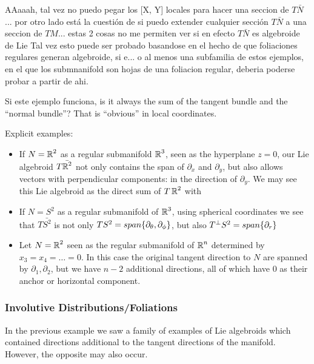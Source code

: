 AAaaah, tal vez no puedo pegar los [X, Y] locales para hacer una seccion de $T \bar N$... por otro lado está la cuestión de si puedo extender cualquier sección $T \bar N$ a una seccion de $TM$... estas 2 cosas no me permiten ver si en efecto $T \bar N$ es algebroide de Lie  Tal vez esto puede ser probado basandose en el hecho de que foliaciones regulares generan algebroide, si e... o al menos una subfamilia de estos ejemplos, en el que los submnanifold son hojas de una foliacion regular, deberia poderse probar a partir de ahi.

Si este ejemplo funciona, is it always the sum of the tangent bundle and the ``normal bundle''? That is ``obvious'' in local coordinates.




Explicit examples:
\begin{itemize}
\item If $N = \operatorname{\mathbb{R}}^2$ as a regular submanifold $\operatorname{\mathbb{R}}^3$, seen as the hyperplane $z = 0$, our Lie algebroid $T \bar {\operatorname{\mathbb{R}}^2}$ not only contains the span of $\partial_x$ and $\partial_y$, but also allows vectors with perpendicular components: in the direction of $\partial_y$. We may see this Lie algebroid as the direct sum of $T \operatorname{\mathbb{R}}^2$ with 
\item If $N = S^2$ as a regular submanifold of $\operatorname{\mathbb{R}}^3$, using spherical coordinates we see that $T \bar {S^2}$ is not only $TS^2 = span\{\partial_\theta, \partial_\phi\}$, but also $T^\perp S^2 = span\{\partial_r\}$ 
\item Let $N = \operatorname{\mathbb{R}}^2$ seen as the regular submanifold of $\operatorname{\mathbb{R}}^n$ determined by $x_3 = x_4 = \dots = 0$. In this case the original tangent direction to $N$ are spanned by $\partial_1, \partial_2$, but we have $n-2$ additional directions, all of which have $0$ as their anchor or horizontal component.
\end{itemize}

\subsubsection{Involutive Distributions/Foliations}

In the previous example we saw a family of examples of Lie algebroids which contained directions additional to the tangent directions of the manifold. However, the opposite may also occur.

